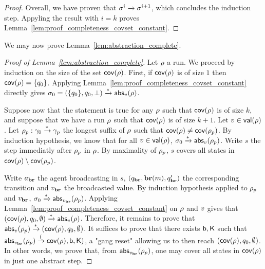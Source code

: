 \begin{proof}
Overall, we have proven that $\sigma^i \xrightarrow{} \sigma^{i+1}$, which concludes the induction step. Appyling the result with $i = k$ proves Lemma~\ref{lem:proof_completeness_covset_constant}. 

\end{proof}

We may now prove Lemma~\ref{lem:abstraction_complete}. 

\begin{proof}[Proof of Lemma~\ref{lem:abstraction_complete}]
Let $\rho$ a run.
We proceed by induction on the size of the set $\mathsf{cov}(\rho)$. 
First, if $\mathsf{cov}(\rho)$ is of size $1$ then $\mathsf{cov}(\rho) = \{q_0\}$. Applying Lemma~\ref{lem:proof_completeness_covset_constant} directly gives $\sigma_0 = (\{q_0\}, q_0, \bot) \xrightarrow{*} \mathsf{abs}_{v}(\rho)$.


Suppose now that the statement is true for any $\rho$ such that $\mathsf{cov}(\rho)$ is of size $k$, and suppose that we have a run $\rho$ such that $\mathsf{cov}(\rho)$ is of size $k+1$. Let $v \in \mathsf{val}(\rho)$. Let $\rho_p: \gamma_0 \xrightarrow{*}\gamma_p$ the longest suffix of $\rho$ such that $\mathsf{cov}(\rho) \ne \mathsf{cov}(\rho_p)$. By induction hypothesis, we know that for all $v \in \mathsf{val}(\rho)$, $\sigma_0 \xrightarrow{*} \mathsf{abs}_{v}(\rho_p)$. Write $s$ the step immediatly after $\rho_p$ in $\rho$. By maximality of $\rho_p$, $s$ covers all states in $\mathsf{cov}(\rho) \setminus \mathsf{cov}(\rho_p)$. 

Write $a_{\textbf{br}}$ the agent broadcasting in $s$, $(q_{\textbf{br}}, \textbf{br}(m), q_{\textbf{br}}')$ the corresponding transition and $v_{\textbf{br}}$ the broadcasted value. By induction hypothesis applied to $\rho_p$ and $v_{\textbf{br}}$, $\sigma_0 \xrightarrow{*} \mathsf{abs}_{v_{\textbf{br}}}(\rho_p)$. Applying Lemma~\ref{lem:proof_completeness_covset_constant} on $\rho$ and $v$ gives that $(\mathsf{cov}(\rho), q_0, \emptyset) \xrightarrow{*} \mathsf{abs}_{v}(\rho)$. Therefore, it remains to prove that $\mathsf{abs}_{v}(\rho_p) \xrightarrow{*} (\mathsf{cov}(\rho), q_0, \emptyset)$. It suffices to prove that there exists $\mathsf{b}, \mathsf{K}$ such that $\mathsf{abs}_{v_{\textbf{br}}}(\rho_p) \xrightarrow{(}\mathsf{cov}(\rho), \mathsf{b},\mathsf{K})$, a "gang reset" allowing us to then reach $(\mathsf{cov}(\rho), q_0, \emptyset)$. In other words, we prove that, from $\mathsf{abs}_{v_{\textbf{br}}}(\rho_p)$, one may cover all states in $\mathsf{cov}(\rho)$ in just one abstract step.


\end{proof}
